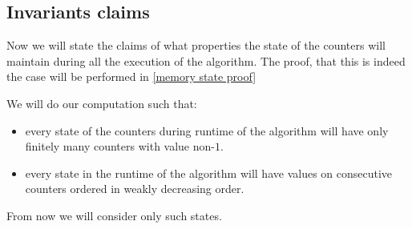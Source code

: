 \subsection{Invariants claims}
Now we will state the claims of what properties the state of the counters will maintain 
during all the execution of the algorithm. The proof, that this is indeed the case will 
be performed in 
\ref{memory state proof}
\begin{claim}\label{valid state of counters}
We will do our computation such that:
\begin{itemize}
\item every state of the counters during runtime of the algorithm will have only finitely many 
counters with value non-$1$. 
\item every state in the runtime of the algorithm 
will have values on consecutive counters ordered in weakly decreasing order.
\end{itemize}
\end{claim}
From now we will 
consider only such states. 

